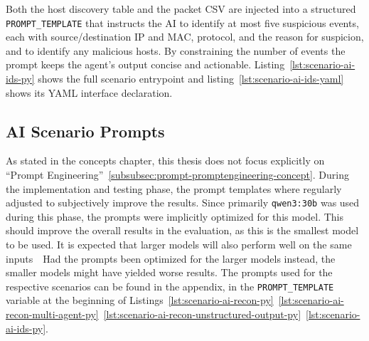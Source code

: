 Both the host discovery table and the packet \gls{CSV} are injected into a structured \texttt{PROMPT_TEMPLATE} that instructs the \gls{AI} to identify at most five suspicious events,
each with source/destination \gls{IP} and \gls{MAC}, protocol, and the reason for suspicion, and to identify any malicious hosts.
By constraining the number of events the prompt keeps the agent's output concise and actionable.
Listing~\ref{lst:scenario-ai-ids-py} shows the full scenario entrypoint and listing~\ref{lst:scenario-ai-ids-yaml} shows its \gls{YAML} interface declaration.

\subsection{\gls{AI} Scenario Prompts}\label{subsec:ai-scenario-prompts}

As stated in the concepts chapter,
this thesis does not focus explicitly on \enquote{Prompt Engineering}~\ref{subsubsec:prompt-promptengineering-concept}.
During the implementation and testing phase,
the prompt templates where regularly adjusted to subjectively improve the results.
Since primarily \texttt{qwen3:30b} was used during this phase,
the prompts were implicitly optimized for this model.
This should improve the overall results in the evaluation,
as this is the smallest model to be used.
It is expected that larger models will also perform well on the same inputs~\textthreequartersemdash~Had the prompts been optimized for the larger models instead, the smaller models might have yielded worse results.
The prompts used for the respective scenarios can be found in the appendix,
in the \texttt{PROMPT_TEMPLATE} variable at the beginning of Listings~\ref{lst:scenario-ai-recon-py}~\ref{lst:scenario-ai-recon-multi-agent-py}~\ref{lst:scenario-ai-recon-unstructured-output-py}~\ref{lst:scenario-ai-ids-py}.
